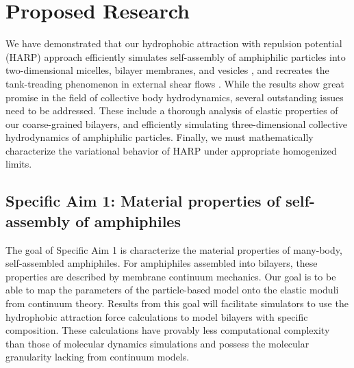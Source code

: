 \section{Proposed Research}
\label{sec:proposed-work}
We have demonstrated that our hydrophobic attraction with repulsion potential (HARP) approach efficiently simulates
self-assembly of amphiphilic particles into two-dimensional micelles, bilayer membranes, and vesicles \cite{Fu2018_SIAM}, and
recreates the tank-treading phenomenon in external shear flows
\cite{Fu20}.
%
While the results show great promise in the field of collective body hydrodynamics,
several outstanding issues need to be addressed. These include a thorough 
analysis of elastic properties of our coarse-grained bilayers, and 
efficiently simulating three-dimensional collective hydrodynamics of amphiphilic particles.
Finally, we must mathematically characterize the variational behavior of HARP under appropriate homogenized limits.

\subsection{Specific Aim 1: Material properties of self-assembly of amphiphiles}
\label{subsec:specific_aim_1}

The goal of Specific Aim 1 is characterize the material properties of many-body, self-assembled amphiphiles.
For amphiphiles assembled into bilayers, these properties are described by membrane continuum mechanics.
Our goal is to be able to map the parameters of the particle-based model onto the elastic moduli from continuum theory.
Results from this goal will facilitate simulators to use the hydrophobic attraction force calculations
to model bilayers with specific composition. These calculations have provably less computational complexity than
those of molecular dynamics simulations and possess the molecular granularity lacking from continuum models.

